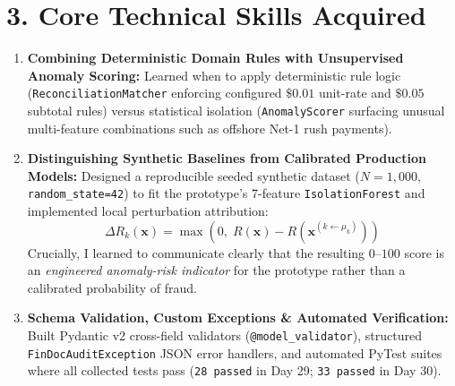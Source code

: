 \documentclass[a4paper,10pt]{article}
\begin{document}
\section{3. Core Technical Skills Acquired}
\begin{enumerate}[leftmargin=0.22in, itemsep=3pt]
    \item \textbf{Combining Deterministic Domain Rules with Unsupervised Anomaly Scoring:} Learned when to apply deterministic rule logic (\texttt{ReconciliationMatcher} enforcing configured $\$0.01$ unit-rate and $\$0.05$ subtotal rules) versus statistical isolation (\texttt{AnomalyScorer} surfacing unusual multi-feature combinations such as offshore Net-1 rush payments).
    \item \textbf{Distinguishing Synthetic Baselines from Calibrated Production Models:} Designed a reproducible seeded synthetic dataset ($N=1{,}000$, \texttt{random\_state=42}) to fit the prototype's 7-feature \texttt{IsolationForest} and implemented local perturbation attribution:
    \[
        \Delta R_k(\mathbf{x}) = \max\!\left(0,\; R(\mathbf{x}) - R\!\left(\mathbf{x}^{(k \leftarrow \mu_k)}\right)\right)
    \]
    Crucially, I learned to communicate clearly that the resulting $0\text{--}100$ score is an \textit{engineered anomaly-risk indicator} for the prototype rather than a calibrated probability of fraud.
    \item \textbf{Schema Validation, Custom Exceptions \& Automated Verification:} Built Pydantic v2 cross-field validators (\texttt{@model\_validator}), structured \texttt{FinDocAuditException} JSON error handlers, and automated PyTest suites where all collected tests pass (\texttt{28 passed} in Day 29; \texttt{33 passed} in Day 30).
\end{enumerate}

\newpage
\end{document}
